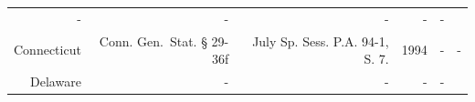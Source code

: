 \documentclass[]{article}
\begin{document}
\begin{longtable}[c]{@{}rrrrrr@{}}
\begin{minipage}[t]{0.21\columnwidth}
-
\strut\end{minipage} &
\begin{minipage}[t]{0.22\columnwidth}\raggedleft\strut
-
\strut\end{minipage} &
\begin{minipage}[t]{0.10\columnwidth}\raggedleft\strut
-
\strut\end{minipage} &
\begin{minipage}[t]{0.10\columnwidth}\raggedleft\strut
-
\strut\end{minipage} &
\begin{minipage}[t]{0.10\columnwidth}\raggedleft\strut
-
\strut\end{minipage}\tabularnewline
\begin{minipage}[t]{0.10\columnwidth}\raggedleft\strut
Connecticut
\strut\end{minipage} &
\begin{minipage}[t]{0.21\columnwidth}\raggedleft\strut
Conn. Gen.~Stat. § 29-36f
\strut\end{minipage} &
\begin{minipage}[t]{0.22\columnwidth}\raggedleft\strut
July Sp. Sess. P.A. 94-1, S. 7.
\strut\end{minipage} &
\begin{minipage}[t]{0.10\columnwidth}\raggedleft\strut
1994
\strut\end{minipage} &
\begin{minipage}[t]{0.10\columnwidth}\raggedleft\strut
-
\strut\end{minipage} &
\begin{minipage}[t]{0.10\columnwidth}\raggedleft\strut
-
\strut\end{minipage}\tabularnewline
\begin{minipage}[t]{0.10\columnwidth}\raggedleft\strut
Delaware
\strut\end{minipage} &
\begin{minipage}[t]{0.21\columnwidth}\raggedleft\strut
-
\strut\end{minipage} &
\begin{minipage}[t]{0.22\columnwidth}\raggedleft\strut
-
\strut\end{minipage} &
\begin{minipage}[t]{0.10\columnwidth}\raggedleft\strut
-
\strut\end{minipage} &
\begin{minipage}[t]{0.10\columnwidth}\raggedleft\strut
-
\strut\end{minipage} &
\begin{minipage}[t]{0.10\columnwidth}\raggedleft\strut

\end{minipage}
\end{longtable}
\end{document}
